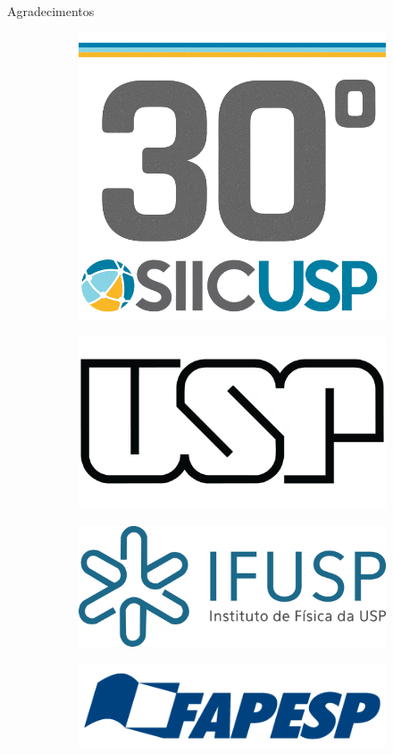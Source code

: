 \documentclass[aspectratio=169]{beamer}
\begin{document}
\begin{frame}{Agradecimentos}

\begin{figure}[H]
\centering
\begin{subfigure}{.3\textwidth}
  \centering
  \includegraphics[width=0.6\linewidth]{logos/siicusp30.png}
  \label{logo:siicusp}
\end{subfigure}
\begin{subfigure}{.3\textwidth}
  \centering
  \includegraphics[width=0.6\linewidth]{logos/usp.jpg}
  \label{logo:usp}
\end{subfigure}
\end{figure}

\n\n

\begin{figure}[H]
\centering
\begin{subfigure}{.3\textwidth}
  \centering
  \includegraphics[width=0.8\linewidth]{logos/ifusp.png}
  \label{logo:ifusp}
\end{subfigure}
\begin{subfigure}{.3\textwidth}
  \centering
  \includegraphics[width=0.8\linewidth]{logos/fapesp.png}
  \label{logo:fapesp}
\end{subfigure}
\end{figure}


\end{frame}
\end{document}
